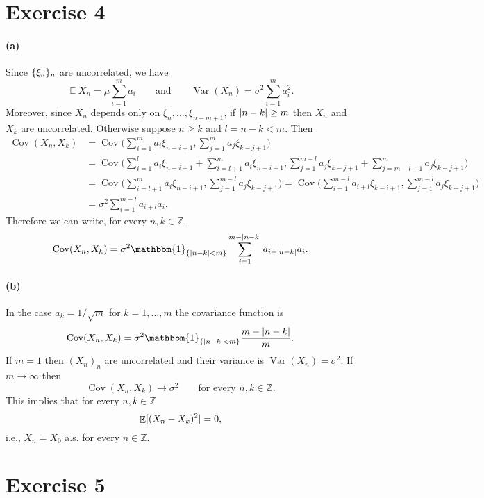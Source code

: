 \documentclass[a4paper,11pt]{article}
\theoremstyle{definition}
\theoremstyle{plain}
\theoremstyle{remark}
\DeclarePairedDelimiter{\abs}{\lvert}{\rvert}
\DeclarePairedDelimiter{\parq}{[}{]}
\DeclarePairedDelimiter{\bra}{\lbrace}{\rbrace}
\DeclareMathOperator*{\expval}{\mathbb{E}}
\DeclareMathOperator*{\varval}{\mathrm{Var}}
\DeclareMathOperator*{\covval}{\mathrm{Cov}}
\begin{document}
\section*{Exercise 4}

\paragraph*{(a)}

Since $\bra{\xi_n}_n$ are uncorrelated, we have 
$$
\expval{X_n} = \mu\sum_{i=1}^ma_i \qquad \text{and} \qquad \varval(X_n) =  \sigma^2\sum_{i=1}^ma_i^2.
$$ 
Moreover, since $X_n$ depends only on $\xi_n,\dots,\xi_{n-m+1}$, if $\abs{n-k}\geq m$ then $X_n$ and $X_k$ are uncorrelated. Otherwise suppose $n\geq k$ and $l = n-k<m$. Then
\begin{align*}
\covval(X_n,X_k) & = \covval\big(\sum_{i=1}^m a_i\xi_{n-i+1},\sum_{j=1}^m a_j\xi_{k-j+1}\big)  \\ & = \covval\big(\sum_{i=1}^l a_i\xi_{n-i+1}+\sum_{i=l+1}^m a_i\xi_{n-i+1},\sum_{j=1}^{m-l} a_j\xi_{k-j+1}+\sum_{j=m-l+1}^m a_j\xi_{k-j+1}\big) \\ & = \covval\big(\sum_{i=l+1}^m a_i\xi_{n-i+1},\sum_{j=1}^{m-l} a_j\xi_{k-j+1}\big) = \covval\big(\sum_{i=1}^{m-l} a_{i+l}\xi_{k-i+1},\sum_{j=1}^{m-l} a_j\xi_{k-j+1}\big) \\ & =
\sigma^2\sum_{i=1}^{m-l} a_{i+l}a_i.
\end{align*}
Therefore we can write, for every $n,k \in \mathbb{Z}$,
$$
\covval(X_n,X_k)=\sigma^2\mathbbm{1}_{\bra{\abs{n-k}<m}}\sum_{i=1}^{m-\abs{n-k}} a_{i+\abs{n-k}}a_i.
$$

\paragraph*{(b)}

In the case $a_k=1/\sqrt{m}$ for $k=1,\dots,m$ the covariance function is 
$$
\covval(X_n,X_k)=\sigma^2\mathbbm{1}_{\bra{\abs{n-k}<m}}\frac{m-\abs{n-k}}{m}.
$$
If $m=1$ then $(X_n)_n$ are uncorrelated and their variance is $\varval(X_n) = \sigma^2$. If $m\to\infty$ then
$$
\covval(X_n,X_k) \to \sigma^2 \qquad \text{for every $n,k\in\mathbb{Z}$}.
$$
This implies that for every $n,k\in\mathbb{Z}$
$$
\expval\parq{(X_n-X_k)^2}=0,
$$
i.e., $X_n=X_0$ a.s. for every $n\in\mathbb{Z}$.

\section*{Exercise 5}
\end{document}

